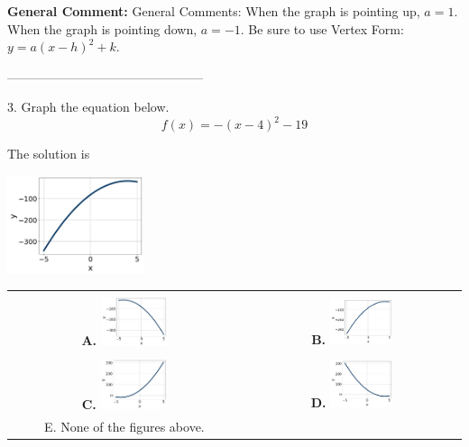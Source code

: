 \documentclass{extbook}[14pt]
\begin{document}
\textbf{General Comment:} General Comments: When the graph is pointing up, $a=1$. When the graph is pointing down, $a=-1$. Be sure to use Vertex Form: $y = a(x-h)^2+k$. 

-----------------------------------------------

3. Graph the equation below.
\[ f(x) = -(x-4)^2 - 19 \] 

 
 The solution is  
 \begin{center} \includegraphics[width=0.3\textwidth]{../Figures/quadraticEquationToGraphBA.png} \end{center}\begin{tabular}{|c|c|} 
\hline 
 & \tabularnewline 
 \textbf{A.} \includegraphics[width=0.3\textwidth]{../Figures/quadraticEquationToGraphAA.png} & \textbf{B.} \includegraphics[width=0.3\textwidth]{../Figures/quadraticEquationToGraphBA.png} \tabularnewline 
\hline 
 & \tabularnewline 
 \textbf{C.} \includegraphics[width=0.3\textwidth]{../Figures/quadraticEquationToGraphCA.png} & \textbf{D.} \includegraphics[width=0.3\textwidth]{../Figures/quadraticEquationToGraphDA.png} \tabularnewline 
\hline 
 E. None of the figures above. & \tabularnewline 
\hline 
 \end{tabular} 
 
\end{document}
